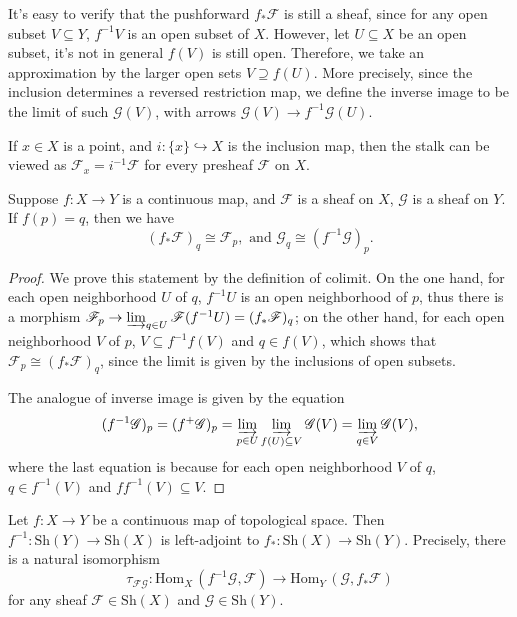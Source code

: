 \documentclass[11pt]{article}
\begin{document}
It's easy to verify that the pushforward $ f_{*}\mathscr{F} $ is still a sheaf, 
since for any open subset $ V \subseteq Y $, $ f^{-1}V $ is an open subset of $ X $. 
However, let $ U \subseteq X $ be an open subset, it's not in general $ f(V) $ is still open. 
Therefore, we take an approximation by the larger open sets $ V \supseteq f(U) $. 
More precisely, since the inclusion determines a reversed restriction map, 
we define the inverse image to be the limit of such $ \mathscr{G}(V) $, 
with arrows $ \mathscr{G}(V) \to f^{-1}\mathscr{G}(U) $. 

If $ x \in X $ is a point, and $ i: \{x\} \hookrightarrow X $ is the inclusion map, 
then the stalk can be viewed as $ \mathscr{F}_{x}= i^{-1}\mathscr{F} $ for every presheaf $ \mathscr{F} $ 
on $ X $. 

\begin{lemma}
  \label{lemma: stalks of image}
  \cite[Exercise 2.2.I, 2.7.C]{vakilTheRisingSea}
  Suppose $ f:X \to Y $ is a continuous map, and $ \mathscr{F} $ is a sheaf on $ X $, 
  $ \mathscr{G} $ is a sheaf on $ Y $. 
  If $ f(p)=q $, then we have 
  $$ (f_{*}\mathscr{F})_{q} \cong \mathscr{F}_{p},\,\,\text{and}\,\, 
  \mathscr{G}_{q} \cong (f^{-1} \mathscr{G})_{p}.$$   
\end{lemma}

\begin{proof}
  We prove this statement by the definition of colimit. 
  On the one hand, for each open neighborhood $ U $ of $ q $, $ f^{-1}U $ is an open neighborhood 
  of $ p $, thus there is a morphism 
  $ \mathscr{F}_{p} \to  \varinjlim_{q \in U}\mathscr{F}(f^{-1}U) = (f_{*}\mathscr{F})_{q} $; 
  on the other hand, for each open neighborhood $ V $ of $ p $, $ V \subseteq f^{-1}f(V) $ 
  and $ q \in f(V) $, which shows that $ \mathscr{F}_{p} \cong (f_{*}\mathscr{F})_{q} $, 
  since the limit is given by the inclusions of open subsets. 
  
  The analogue of inverse image is given by the equation 
  $$ (f^{-1}\mathscr{G})_{p} = (f^{+}\mathscr{G})_{p} =  \varinjlim_{p \in U} 
  \varinjlim_{f(U) \subseteq V}\mathscr{G}(V)
  = \varinjlim_{q \in V}\mathscr{G}(V), $$ 
  where the last equation is because for each open neighborhood $ V $ of $ q $, 
  $q \in f^{-1}(V) $ and $ ff^{-1}(V) \subseteq V $.  
\end{proof}

\begin{proposition}
  \label{prop: image adjoint}
  \cite[Exercise II.1.18]{hartsAG}
  Let $f: X \to Y$ be a continuous map of topological space. 
  Then $f^{-1}:\mathrm{Sh}(Y) \to \mathrm{Sh}(X)$ is left-adjoint 
  to $f_{*}:\mathrm{Sh}(X)\to \mathrm{Sh}(Y)$. 
  Precisely, there is a natural isomorphism 
  $$\tau_{\mathscr{F}\mathscr{G}}:
  \mathrm{Hom}_{X}\,(f^{-1}\mathscr{G},\mathscr{F})\to \mathrm{Hom}_{Y}
  \,(\mathscr{G},f_{*}\mathscr{F})$$ 
  for any sheaf $\mathscr{F}\in \mathrm{Sh}(X)$ and $\mathscr{G}\in \mathrm{Sh}(Y)$. 
\end{proposition}
\end{document}
